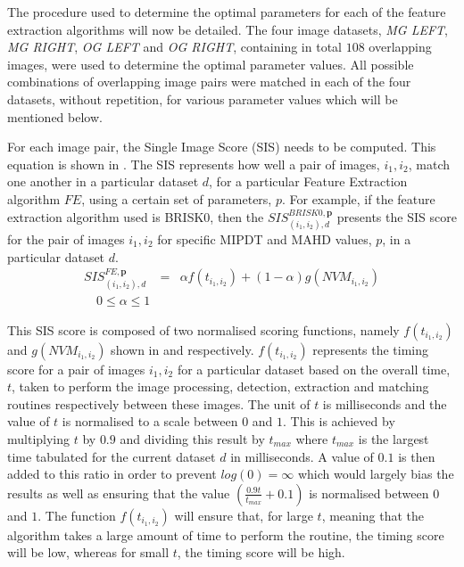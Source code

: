 \documentclass{report}
\begin{document}
The procedure used to determine the optimal parameters for each of the feature extraction algorithms will now be detailed. The four image datasets, \textit{MG LEFT}, \textit{MG RIGHT}, \textit{OG LEFT} and \textit{OG RIGHT}, containing in total $108$ overlapping images, were used to determine the optimal parameter values. All possible combinations of overlapping image pairs were matched in each of the four datasets, without repetition, for various parameter values which will be mentioned below. 

For each image pair, the Single Image Score (SIS) needs to be computed. This equation is shown in . The SIS represents how well a pair of images, $i_1, i_2$, match one another in a particular dataset $d$, for a particular Feature Extraction algorithm $FE$, using a certain set of parameters, $p$. For example, if the feature extraction algorithm used is BRISK0, then the $SIS_{(i_1, i_2), d}^{BRISK0, \textbf{p}}$ presents the SIS score for the pair of images $i_1, i_2$ for specific MIPDT and MAHD values, $p$, in a particular dataset $d$. \\

\begin{eqnarray}
SIS_{(i_1, i_2), d}^{FE, \textbf{p}} &=& \alpha f(t_{i_1,i_2}) + (1-\alpha) g(\textit{NVM}_{i_1,i_2})\\ 
\quad 0 \leq \alpha \leq 1 
\label{eqn:optimalParameters}
\end{eqnarray}

This SIS score is composed of two normalised scoring functions, namely $f(t_{i_1, i_2})$ and $g(NVM_{i_1, i_2})$ shown in  and  respectively. $f(t_{i_1, i_2})$ represents the timing score for a pair of images $i_1, i_2$ for a particular dataset based on the overall time, $t$, taken to perform the image processing, detection, extraction and matching routines respectively between these images. The unit of $t$ is milliseconds and the value of $t$ is normalised to a scale between $0$ and $1$. This is achieved by multiplying $t$ by $0.9$ and dividing this result by $t_{max}$ where $t_{max}$ is the largest time tabulated for the current dataset $d$ in milliseconds. A value of $0.1$ is then added to this ratio in order to  prevent $log(0) = \infty$ which would largely bias the results as well as ensuring that the value $(\frac{0.9 t}{t_{max}} + 0.1)$ is normalised between $0$ and $1$. The function $f(t_{i_1, i_2})$ will ensure that, for large $t$, meaning that the algorithm takes a large amount of time to perform the routine, the timing score will be low, whereas for small $t$, the timing score will be high. \\
\end{document}
